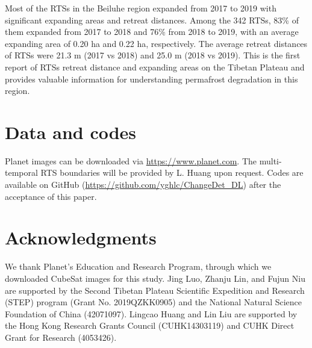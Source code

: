 \documentclass[authoryear,preprint,review,12pt]{elsarticle}
\begin{document}
Most of the RTSs in the Beiluhe region expanded from 2017 to 2019 with significant expanding areas and retreat distances. 
Among the 342 RTSs, 83\% of them expanded from 2017 to 2018 and 76\% from 2018 to 2019, with an average expanding area of 0.20 ha and 0.22 ha, respectively.
The average retreat distances of RTSs were 21.3 m (2017 vs 2018) and 25.0 m (2018 vs 2019).
This is the first report of RTSs retreat distance and expanding areas on the Tibetan Plateau and provides valuable information for understanding permafrost degradation in this region. 


\section{Data and codes}
\label{sec_data_codes}

Planet images can be downloaded via \url{https://www.planet.com}. 
The multi-temporal RTS boundaries will be provided by L. Huang upon request. 
Codes are available on GitHub (\url{https://github.com/yghlc/ChangeDet_DL}) after the acceptance of this paper.

\section{Acknowledgments}
\label{sec_acknowledgments}


We thank Planet's Education and Research Program, through which we downloaded CubeSat images for this study. 
Jing Luo, Zhanju Lin, and Fujun Niu are supported by the Second Tibetan Plateau Scientific Expedition and Research (STEP) program (Grant No. 2019QZKK0905) and the National Natural Science Foundation of China (42071097).
Lingcao Huang and Lin Liu are supported by the Hong Kong Research Grants Council (CUHK14303119) and CUHK Direct Grant for Research (4053426).




\end{document}
